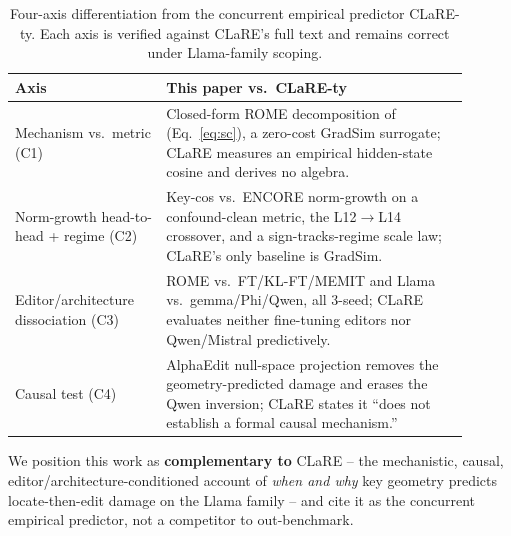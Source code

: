 \begin{table}[t]
\centering\small
\begin{tabular}{@{}p{0.30\linewidth}p{0.60\linewidth}@{}}
\toprule
\textbf{Axis} & \textbf{This paper vs.\ CLaRE-ty} \\
\midrule
Mechanism vs.\ metric (C1) & Closed-form ROME \SxC{} decomposition of \dW{}
  (Eq.~\ref{eq:sc}), a zero-cost GradSim surrogate; CLaRE measures an empirical
  hidden-state cosine and derives no algebra. \\
Norm-growth head-to-head + regime (C2) & Key-cos vs.\ ENCORE norm-growth on a
  confound-clean metric, the L12$\rightarrow$L14 crossover, and a sign-tracks-regime
  scale law; CLaRE's only baseline is GradSim. \\
Editor\slash architecture dissociation (C3) & ROME vs.\ FT\slash KL-FT\slash MEMIT and
  Llama vs.\ gemma/Phi/Qwen, all 3-seed; CLaRE evaluates neither fine-tuning
  editors nor Qwen/Mistral predictively. \\
Causal test (C4) & AlphaEdit null-space projection removes the
  geometry-predicted damage and erases the Qwen inversion; CLaRE states it
  ``does not establish a formal causal mechanism.'' \\
\bottomrule
\end{tabular}
\caption{Four-axis differentiation from the concurrent empirical predictor
CLaRE-ty. Each axis is verified against CLaRE's full text and remains correct
under Llama-family scoping.}
\label{tab:clare}
\end{table}

We position this work as \textbf{complementary to} CLaRE -- the mechanistic, causal,
editor/architecture-conditioned account of \emph{when and why} key geometry
predicts locate-then-edit damage on the Llama family -- and cite it as the
concurrent empirical predictor, not a competitor to out-benchmark.

